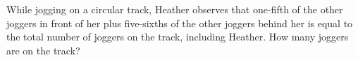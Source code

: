 While jogging on a circular track, Heather observes that one-fifth of the other joggers in front of her plus five-sixths of the other joggers behind her is equal to the total number of joggers on the track, including Heather. How many joggers are on the track?
